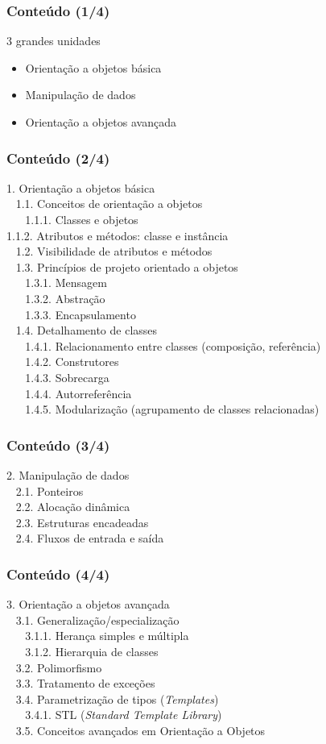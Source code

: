 \documentclass[aspectratio=169]{beamer}
\begin{document}
\begin{frame}\frametitle{Conte\'udo (1/4)}
3 grandes unidades
\begin{itemize}
	\item Orientação a objetos básica
	\item Manipulação de dados
	\item Orientação a objetos avançada
\end{itemize}
\end{frame}

\begin{frame}\frametitle{Conte\'udo (2/4)}
\small{1. Orientação a objetos básica\\
~ 1.1. Conceitos de orientação a objetos\\
~ ~ 1.1.1. Classes e objetos\\
1.1.2. Atributos e métodos: classe e instância\\
~ 1.2. Visibilidade de atributos e métodos\\
~ 1.3. Princípios de projeto orientado a objetos\\
~ ~ 1.3.1. Mensagem\\
~ ~ 1.3.2. Abstração\\
~ ~ 1.3.3. Encapsulamento\\
~ 1.4. Detalhamento de classes\\
~ ~ 1.4.1. Relacionamento entre classes (composição, referência)\\
~ ~ 1.4.2. Construtores\\
~ ~ 1.4.3. Sobrecarga\\
~ ~ 1.4.4. Autorreferência\\
~ ~ 1.4.5. Modularização (agrupamento de classes relacionadas)}
\end{frame}

\begin{frame}\frametitle{Conte\'udo (3/4)}
2. Manipulação de dados\\
~ 2.1. Ponteiros\\
~ 2.2. Alocação dinâmica\\
~ 2.3. Estruturas encadeadas\\
~ 2.4. Fluxos de entrada e saída
\end{frame}

\begin{frame}\frametitle{Conte\'udo (4/4)}
3. Orientação a objetos avançada\\
~ 3.1. Generalização/especialização\\
~ ~ 3.1.1. Herança simples e múltipla\\
~ ~ 3.1.2. Hierarquia de classes\\
~ 3.2. Polimorfismo\\
~ 3.3. Tratamento de exceções\\
~ 3.4. Parametrização de tipos (\emph{Templates})\\
~ ~ 3.4.1. STL (\emph{Standard Template Library})\\
~ 3.5. Conceitos avançados em Orientação a Objetos
\end{frame}
\end{document}
